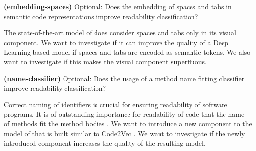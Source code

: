 \documentclass[%
class=scrreprt,
chapterprefix=false,%
open=right,%
twoside=false,%
paper=a4,%
logofile={Logo\_zentral\_farbig\_EN.png},%
thesistype=masterproposal,%
UKenglish,%
]{se2thesis}
\begin{document}
	\begin{resq} \textbf{(embedding-spaces)} Optional: Does the embedding of spaces and tabs in semantic code representations improve readability classification?\end{resq} \label{embedding-spaces}
	The state-of-the-art model of \citeauthor{mi2022towards} \cite{mi2022towards} does consider spaces and tabs only in its visual component. We want to investigate if it can improve the quality of a Deep Learning based model if spaces and tabs are encoded as semantic tokens. We also want to investigate if this makes the visual component superfluous.
	
	\begin{resq} \textbf{(name-classifier)} Optional: Does the usage of a method name fitting classifier improve readability classification?\end{resq} \label{name-classifier}
	Correct naming of identifiers is crucial for ensuring readability of software programs. It is of outstanding importance for readability of code that the name of methods fit the method bodies \cite{liu2019learning}. We want to introduce a new component to the model of \citeauthor{mi2022towards} \cite{mi2022towards} that is built similar to Code2Vec \cite{alon2019code2vec}. We want to investigate if the newly introduced component increases the quality of the resulting model.
	
	\backmatter
	
	\printbibliography
	
\end{document}
